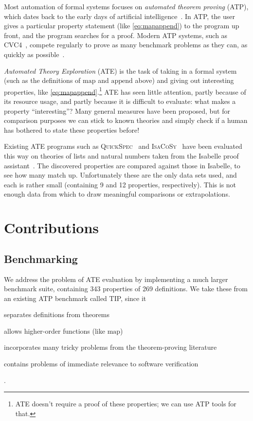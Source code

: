 \documentclass[]{default}
\newcommand{\name}[1]{\mathrm{#1}}
\begin{document}
Most automation of formal systems focuses on \emph{automated theorem proving}
(ATP), which dates back to the early days of artificial
intelligence~\cite{newell1956logic}. In ATP, the user gives a particular
property statement (like \ref{eq:mapappend}) to the program up front, and the
program searches for a proof. Modern ATP systems, such as
CVC4~\cite{barrett2011cvc4}, compete regularly to prove as many benchmark
problems as they can, as quickly as possible~\cite{sutcliffe2006state}.

\emph{Automated Theory Exploration} (ATE) is the task of taking in a formal
system (such as the definitions of $\name{map}$ and $\name{append}$ above) and
giving out interesting properties, like \ref{eq:mapappend}.\footnote{ATE doesn't
  require a proof of these properties; we can use ATP tools for that.} ATE has
seen little attention, partly because of its resource usage, and partly because
it is difficult to evaluate: what makes a property ``interesting''? Many general
measures have been proposed\cite{colton2000notion}, but for comparison purposes
we can stick to known theories and simply check if a human has bothered to state
these properties before!

Existing ATE programs such as \textsc{QuickSpec}~\cite{QuickSpec} and
\textsc{IsaCoSy}~\cite{johansson2009isacosy} have been evaluated this way on
theories of lists and natural numbers taken from the Isabelle proof
assistant~\cite{claessen2013automating}. The discovered properties are compared
against those in Isabelle, to see how many match up. Unfortunately these are the
only data sets used, and each is rather small (containing 9 and 12 properties,
respectively). This is not enough data from which to draw meaningful comparisons
or extrapolations.

\section{Contributions}

\subsection{Benchmarking}

We address the problem of ATE evaluation by implementing a much larger benchmark
suite, containing 343 properties of 269 definitions. We take these from an
existing ATP benchmark called TIP\cite{claessen2015tip}, since it
\begin{inlinelist}
\item separates definitions from theorems
\item allows higher-order functions (like $\name{map}$)
\item incorporates many tricky problems from the theorem-proving literature
\item contains problems of immediate relevance to software verification
\end{inlinelist}.
\end{document}

